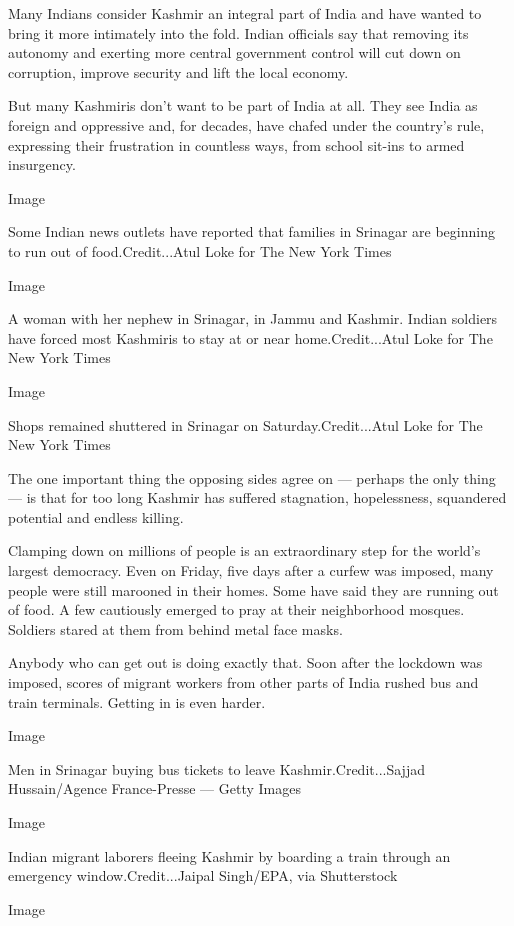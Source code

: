 Many Indians consider Kashmir an integral part of India and have wanted
to bring it more intimately into the fold. Indian officials say that
removing its autonomy and exerting more central government control will
cut down on corruption, improve security and lift the local economy.

But many Kashmiris don't want to be part of India at all. They see India
as foreign and oppressive and, for decades, have chafed under the
country's rule, expressing their frustration in countless ways, from
school sit-ins to armed insurgency.

Image

Some Indian news outlets have reported that families in Srinagar are
beginning to run out of food.Credit...Atul Loke for The New York Times

Image

A woman with her nephew in Srinagar, in Jammu and Kashmir. Indian
soldiers have forced most Kashmiris to stay at or near
home.Credit...Atul Loke for The New York Times

Image

Shops remained shuttered in Srinagar on Saturday.Credit...Atul Loke for
The New York Times

The one important thing the opposing sides agree on --- perhaps the only
thing --- is that for too long Kashmir has suffered stagnation,
hopelessness, squandered potential and endless killing.

Clamping down on millions of people is an extraordinary step for the
world's largest democracy. Even on Friday, five days after a curfew was
imposed, many people were still marooned in their homes. Some have said
they are running out of food. A few cautiously emerged to pray at their
neighborhood mosques. Soldiers stared at them from behind metal face
masks.

Anybody who can get out is doing exactly that. Soon after the lockdown
was imposed, scores of migrant workers from other parts of India rushed
bus and train terminals. Getting in is even harder.

Image

Men in Srinagar buying bus tickets to leave Kashmir.Credit...Sajjad
Hussain/Agence France-Presse --- Getty Images

Image

Indian migrant laborers fleeing Kashmir by boarding a train through an
emergency window.Credit...Jaipal Singh/EPA, via Shutterstock

Image

